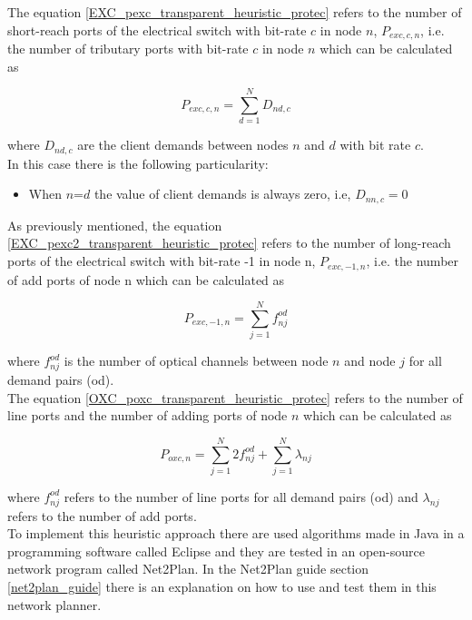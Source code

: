 The equation \ref{EXC_pexc_transparent_heuristic_protec} refers to the number of short-reach ports of the electrical switch with bit-rate $c$ in node $n$, $P_{exc,c,n}$, i.e. the number of tributary ports with bit-rate $c$ in node $n$ which can be calculated as

\begin{equation}
P_{exc,c,n} = \sum_{d=1}^{N} D_{nd,c}
\label{EXC_pexc_transparent_heuristic_protec}
\end{equation}

\noindent
where $D_{nd,c}$ are the client demands between nodes $n$ and $d$ with bit rate $c$.\\

\noindent
In this case there is the following particularity:

\begin{itemize}
  \item When $n$=$d$ the value of client demands is always zero, i.e, $D_{nn,c}=0$
\end{itemize}

As previously mentioned, the equation \ref{EXC_pexc2_transparent_heuristic_protec} refers to the number of long-reach ports of the electrical switch with bit-rate -1 in node n, $P_{exc,-1,n}$, i.e. the number of add ports of node n which can be calculated as

\begin{equation}
P_{exc,-1,n} = \sum_{j=1}^{N} f_{nj}^{od}
\label{EXC_pexc2_transparent_heuristic_protec}
\end{equation}

\noindent
where $f_{nj}^{od}$ is the number of optical channels between node $n$ and node $j$ for all demand pairs (od).\\

\vspace{11pt}
The equation \ref{OXC_poxc_transparent_heuristic_protec} refers to the number of line ports and the number of adding ports of node $n$ which can be calculated as

\begin{equation}
P_{oxc,n} = \sum_{j=1}^{N} 2 f_{nj}^{od} + \sum_{j=1}^{N} \lambda_{nj}
\label{OXC_poxc_transparent_heuristic_protec}
\end{equation}

\noindent
where $f_{nj}^{od}$ refers to the number of line ports for all demand pairs (od) and $\lambda_{nj}$ refers to the number of add ports.\\

\vspace{11pt}
To implement this heuristic approach there are used algorithms made in Java in a programming software called Eclipse and they are tested in an open-source network program called Net2Plan. In the Net2Plan guide section \ref{net2plan_guide} there is an explanation on how to use and test them in this network planner.

